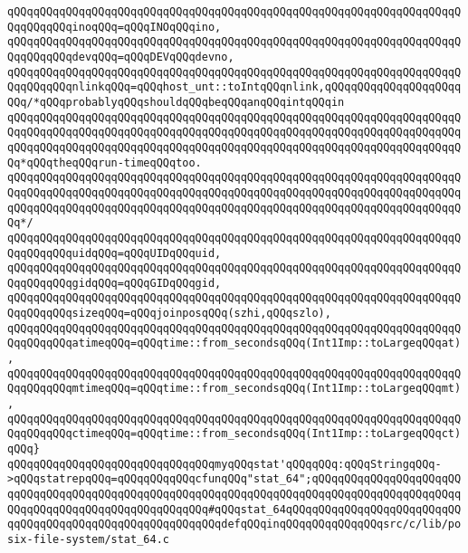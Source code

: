 \verb|qQQqqQQqqQQqqQQqqQQqqQQqqQQqqQQqqQQqqQQqqQQqqQQqqQQqqQQqqQQqqQQqqQQqqQQqqQQqqQQqinoqQQq=qQQqINOqQQqino,|\newline
\verb|qQQqqQQqqQQqqQQqqQQqqQQqqQQqqQQqqQQqqQQqqQQqqQQqqQQqqQQqqQQqqQQqqQQqqQQqqQQqqQQqdevqQQq=qQQqDEVqQQqdevno,|\newline
\verb|qQQqqQQqqQQqqQQqqQQqqQQqqQQqqQQqqQQqqQQqqQQqqQQqqQQqqQQqqQQqqQQqqQQqqQQqqQQqqQQqnlinkqQQq=qQQqhost_unt::toIntqQQqnlink,qQQqqQQqqQQqqQQqqQQqqQQq/*qQQqprobablyqQQqshouldqQQqbeqQQqanqQQqintqQQqin|\newline
\verb|qQQqqQQqqQQqqQQqqQQqqQQqqQQqqQQqqQQqqQQqqQQqqQQqqQQqqQQqqQQqqQQqqQQqqQQqqQQqqQQqqQQqqQQqqQQqqQQqqQQqqQQqqQQqqQQqqQQqqQQqqQQqqQQqqQQqqQQqqQQqqQQqqQQqqQQqqQQqqQQqqQQqqQQqqQQqqQQqqQQqqQQqqQQqqQQqqQQqqQQqqQQqqQQqqQQq*qQQqtheqQQqrun-timeqQQqtoo.|\newline
\verb|qQQqqQQqqQQqqQQqqQQqqQQqqQQqqQQqqQQqqQQqqQQqqQQqqQQqqQQqqQQqqQQqqQQqqQQqqQQqqQQqqQQqqQQqqQQqqQQqqQQqqQQqqQQqqQQqqQQqqQQqqQQqqQQqqQQqqQQqqQQqqQQqqQQqqQQqqQQqqQQqqQQqqQQqqQQqqQQqqQQqqQQqqQQqqQQqqQQqqQQqqQQqqQQqqQQq*/|\newline
\verb|qQQqqQQqqQQqqQQqqQQqqQQqqQQqqQQqqQQqqQQqqQQqqQQqqQQqqQQqqQQqqQQqqQQqqQQqqQQqqQQquidqQQq=qQQqUIDqQQquid,|\newline
\verb|qQQqqQQqqQQqqQQqqQQqqQQqqQQqqQQqqQQqqQQqqQQqqQQqqQQqqQQqqQQqqQQqqQQqqQQqqQQqqQQqgidqQQq=qQQqGIDqQQqgid,|\newline
\verb|qQQqqQQqqQQqqQQqqQQqqQQqqQQqqQQqqQQqqQQqqQQqqQQqqQQqqQQqqQQqqQQqqQQqqQQqqQQqqQQqsizeqQQq=qQQqjoinposqQQq(szhi,qQQqszlo),|\newline
\verb|qQQqqQQqqQQqqQQqqQQqqQQqqQQqqQQqqQQqqQQqqQQqqQQqqQQqqQQqqQQqqQQqqQQqqQQqqQQqqQQqatimeqQQq=qQQqtime::from_secondsqQQq(Int1Imp::toLargeqQQqat),|\newline
\verb|qQQqqQQqqQQqqQQqqQQqqQQqqQQqqQQqqQQqqQQqqQQqqQQqqQQqqQQqqQQqqQQqqQQqqQQqqQQqqQQqmtimeqQQq=qQQqtime::from_secondsqQQq(Int1Imp::toLargeqQQqmt),|\newline
\verb|qQQqqQQqqQQqqQQqqQQqqQQqqQQqqQQqqQQqqQQqqQQqqQQqqQQqqQQqqQQqqQQqqQQqqQQqqQQqqQQqctimeqQQq=qQQqtime::from_secondsqQQq(Int1Imp::toLargeqQQqct)qQQq}|\newline
\newline
\verb|qQQqqQQqqQQqqQQqqQQqqQQqqQQqqQQqmyqQQqstat'qQQqqQQq:qQQqStringqQQq->qQQqstatrepqQQq=qQQqqQQqqQQqcfunqQQq"stat_64";qQQqqQQqqQQqqQQqqQQqqQQqqQQqqQQqqQQqqQQqqQQqqQQqqQQqqQQqqQQqqQQqqQQqqQQqqQQqqQQqqQQqqQQqqQQqqQQqqQQqqQQqqQQqqQQqqQQqqQQqqQQq#qQQqstat_64qQQqqQQqqQQqqQQqqQQqqQQqqQQqqQQqqQQqqQQqqQQqqQQqqQQqqQQqqQQqdefqQQqinqQQqqQQqqQQqqQQqsrc/c/lib/posix-file-system/stat_64.c|\newline
